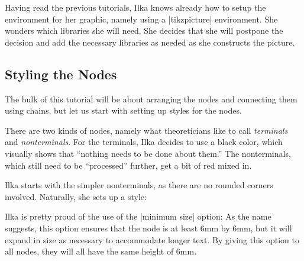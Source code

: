 Having read the previous tutorials, Ilka knows already how to setup
the environment for her graphic, namely using a |tikzpicture|
environment. She wonders which libraries she will need. She decides
that she will postpone the decision and add the necessary libraries as
needed as she constructs the picture.


\subsection{Styling the Nodes}

The bulk of this tutorial will be about arranging the nodes and
connecting them using chains, but let us start with setting up styles
for the nodes.

There are two kinds of nodes, namely what theoreticians like to call
\emph{terminals} and \emph{nonterminals}. For the terminals, Ilka
decides to use a black color, which visually shows that ``nothing
needs to be done about them.'' The nonterminals, which still need to
be ``processed'' further, get a bit of red mixed in.

Ilka starts with the simpler nonterminals, as there are no rounded
corners involved. Naturally, she sets up a style:

\begin{codeexample}[]
\end{codeexample}
Ilka is pretty proud of the use of the |minimum size| option: As the
name suggests, this option ensures that the node is at least 6mm by
6mm, but it will expand in size as necessary to accommodate longer
text. By giving this option to all nodes, they will all have the same
height of 6mm.

